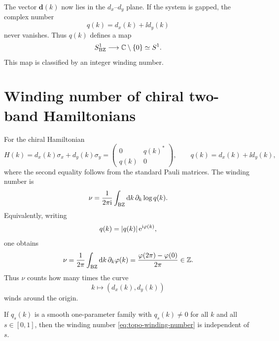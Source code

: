 The vector $\bm d(k)$ now lies in the $d_x$--$d_y$ plane.  If the system is
gapped, the complex number
\begin{equation}
\label{eq:topo-q-definition}
    q(k)=d_x(k)+\ii d_y(k)
\end{equation}
never vanishes.  Thus $q(k)$ defines a map
\begin{equation}
\label{eq:topo-q-map}
    S^1_{\rm BZ}\longrightarrow \mathbb{C}\setminus\{0\}\simeq S^1 .
\end{equation}
This map is classified by an integer winding number.

\section{Winding number of chiral two-band Hamiltonians}
\label{sec:topo-winding-number}

For the chiral Hamiltonian
\begin{equation}
\label{eq:topo-chiral-hamiltonian}
    H(k)=d_x(k)\sigma_x+d_y(k)\sigma_y
    =
    \begin{pmatrix}
        0 & q(k)^*\\
        q(k) & 0
    \end{pmatrix},
    \qquad
    q(k)=d_x(k)+\ii d_y(k),
\end{equation}
where the second equality follows from the standard Pauli matrices.  The winding
number is
\begin{equation}
\label{eq:topo-winding-number}
    \nu
    =
    \frac{1}{2\pi\mathrm{i}}\int_{\rm BZ}\mathrm{d} k\,\partial_k\log q(k).
\end{equation}
Equivalently, writing
\begin{equation}
    q(k)=\left|q(k)\right|\mathrm{e}^{\mathrm{i}\varphi(k)},
\end{equation}
one obtains
\begin{equation}
\label{eq:topo-winding-angle}
    \nu
    =
    \frac{1}{2\pi}\int_{\rm BZ}\mathrm{d} k\,\partial_k\varphi(k)
    =
    \frac{\varphi(2\pi)-\varphi(0)}{2\pi}\in\mathbb{Z} .
\end{equation}
Thus $\nu$ counts how many times the curve
\begin{equation}
    k\longmapsto (d_x(k),d_y(k))
\end{equation}
winds around the origin.

\begin{proposition}
If $q_s(k)$ is a smooth one-parameter family with $q_s(k)\neq 0$ for all
$k$ and all $s\in[0,1]$, then the winding number \cref{eq:topo-winding-number}
is independent of $s$.
\end{proposition}

